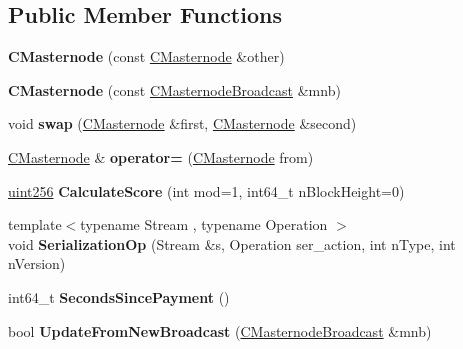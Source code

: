 \subsection*{Public Member Functions}
\begin{DoxyCompactItemize}
\item 
\mbox{\label{class_c_masternode_a45ddf472ea17b5393060b648a1e25291}} 
{\bfseries C\+Masternode} (const \mbox{\hyperlink{class_c_masternode}{C\+Masternode}} \&other)
\item 
\mbox{\label{class_c_masternode_a627dbc7dfeaa9a996bcf7fac3665933b}} 
{\bfseries C\+Masternode} (const \mbox{\hyperlink{class_c_masternode_broadcast}{C\+Masternode\+Broadcast}} \&mnb)
\item 
\mbox{\label{class_c_masternode_a8cad9a9fa0b7afe75ba20254d7790b61}} 
void {\bfseries swap} (\mbox{\hyperlink{class_c_masternode}{C\+Masternode}} \&first, \mbox{\hyperlink{class_c_masternode}{C\+Masternode}} \&second)
\item 
\mbox{\label{class_c_masternode_a914fcf71ebc13a0680bb61e173b206f4}} 
\mbox{\hyperlink{class_c_masternode}{C\+Masternode}} \& {\bfseries operator=} (\mbox{\hyperlink{class_c_masternode}{C\+Masternode}} from)
\item 
\mbox{\label{class_c_masternode_a5193b7bca7224b39c455ddd39f0846f3}} 
\mbox{\hyperlink{classuint256}{uint256}} {\bfseries Calculate\+Score} (int mod=1, int64\+\_\+t n\+Block\+Height=0)
\item 
\mbox{\label{class_c_masternode_ac3514c93cc494ae196dc217df847950d}} 
{\footnotesize template$<$typename Stream , typename Operation $>$ }\\void {\bfseries Serialization\+Op} (Stream \&s, Operation ser\+\_\+action, int n\+Type, int n\+Version)
\item 
\mbox{\label{class_c_masternode_a7579b584c45fe164b39a3adc15f1ebe9}} 
int64\+\_\+t {\bfseries Seconds\+Since\+Payment} ()
\item 
\mbox{\label{class_c_masternode_a96da6f523ec3a160239c966bf0dcf876}} 
bool {\bfseries Update\+From\+New\+Broadcast} (\mbox{\hyperlink{class_c_masternode_broadcast}{C\+Masternode\+Broadcast}} \&mnb)

\end{DoxyCompactItemize}
